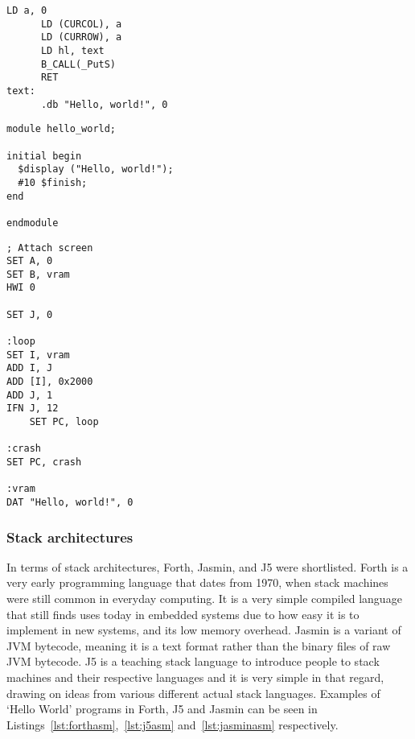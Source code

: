 \noindent\begin{minipage}{0.5\textwidth}
\begin{lstlisting}[caption={Z80 ASM},label={lst:z80asm}]
      LD a, 0
      LD (CURCOL), a
      LD (CURROW), a
      LD hl, text
      B_CALL(_PutS)
      RET
text:
      .db "Hello, world!", 0
\end{lstlisting}%
\end{minipage}%
\noindent\begin{minipage}{0.5\textwidth}
\begin{lstlisting}[caption={Picoblaze ASM},label={lst:picoasm}]
module hello_world;

initial begin
  $display ("Hello, world!");
  #10 $finish;
end

endmodule
\end{lstlisting}%
\end{minipage}

\noindent\begin{minipage}{\linewidth} %
\begin{lstlisting}[caption={DCPU-16 ASM}, label={lst:dcpuasm}]
; Attach screen
SET A, 0
SET B, vram
HWI 0

SET J, 0

:loop
SET I, vram
ADD I, J
ADD [I], 0x2000
ADD J, 1
IFN J, 12
    SET PC, loop

:crash
SET PC, crash

:vram
DAT "Hello, world!", 0
\end{lstlisting}%
\end{minipage}

\subsubsection{Stack architectures}

In terms of stack architectures, Forth, Jasmin, and J5 were shortlisted. Forth
is a very early programming language that dates from 1970, when stack machines
were still common in everyday computing. It is a very simple compiled language
that still finds uses today in embedded systems due to how easy it is to
implement in new systems, and its low memory overhead. Jasmin is a variant of
JVM bytecode, meaning it is a text format rather than the binary files of raw
JVM bytecode. J5 is a teaching stack language to introduce people to stack
machines and their respective languages and it is very simple in that regard,
drawing on ideas from various different actual stack languages. Examples of
`Hello World' programs in Forth, J5 and Jasmin can be seen in
Listings~\ref{lst:forthasm},~\ref{lst:j5asm} and~\ref{lst:jasminasm}
respectively.

